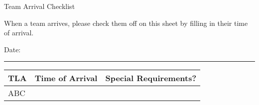 \documentclass[a4paper, 12pt]{article}
\begin{document}
\begin{center}

    {\huge{Team Arrival Checklist}}

    \medskip

\end{center}

When a team arrives, please check them off on this sheet by filling in their time of arrival.
\bigskip

{\large{Date}: \hrulefill}

\begin{center}
\begin{table}[h]
\hrule
\large
\def\arraystretch{1.5}
\begin{tabularx}{\textwidth}{|Y|Y|Y|}
    \textbf{TLA} & \textbf{Time of Arrival} & \textbf{Special Requirements?} \\
\hline
ABC & & \\ \hline
\end{tabularx}
\end{table}
\end{center}
\end{document}

